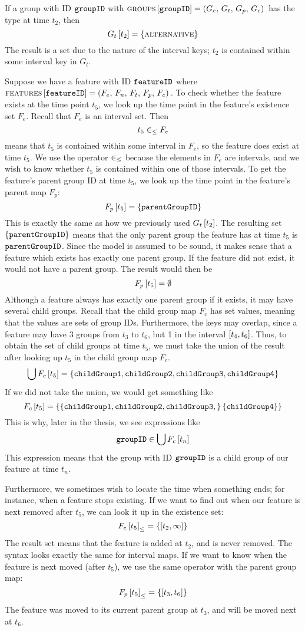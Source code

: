 If a group with ID $\texttt{groupID}$ with $\textsc{groups}{} \left[ \texttt{groupID} \right] = \left(G_e,\, G_t,\, G_p,\, G_c\right){}$ has the type \xortype{} at time $t_2$, then
\[
  G_t \left[ t_2 \right] = \left\{\textsc{alternative}{}\right\}
\]
The result is a set due to the nature of the interval keys; $t_2$ is contained within some interval key in $G_t$. 

Suppose we have a feature with ID $\texttt{featureID}$ where $\textsc{features} \left[ \texttt{featureID} \right] = \left(F_e,\, F_n,\, F_t,\, F_p,\, F_c\right){}$. To check whether the feature exists at the time point $t_5$, we look up the time point in the feature's existence set $F_e$. Recall that $F_e$ is an interval set. Then
\[
  t_5 \in_\leq F_e
\]
means that $t_5$ is contained within some interval in $F_e$, so the feature does exist at time $t_5$. We use the operator $\in_\leq$ because the elements in $F_e$ are intervals, and we wish to know whether $t_5$ is contained within one of those intervals. To get the feature's parent group ID at time $t_5$, we look up the time point in the feature's parent map $F_p$:
\[
  F_p \left[ t_5 \right] = \left\{\texttt{parentGroupID}\right\}
\]
This is exactly the same as how we previously used $G_t \left[ t_2 \right]$. The resulting set $\left\{\texttt{parentGroupID}\right\}$ means that the only parent group the feature has at time $t_5$ is $\texttt{parentGroupID}$. Since the model is assumed to be sound, it makes sense that a feature which exists has exactly one parent group. If the feature did not exist, it would not have a parent group. The result would then be
\[
  F_p \left[ t_5 \right] = \emptyset
\]
Although a feature always has exactly one parent group if it exists, it may have several child groups. Recall that the child group map $F_c$ has set values, meaning that the values are sets of group IDs. Furthermore, the keys may overlap, since a feature may have 3 groups from $t_3$ to $t_6$, but 1 in the interval $\interval{t_4}{t_6}$. Thus, to obtain the set of child groups at time $t_5$, we must take the union of the result after looking up $t_5$ in the child group map $F_c$.
\[
  \bigcup{F_c \left[ t_5 \right]} = \left\{\texttt{childGroup1}, \texttt{childGroup2}, \texttt{childGroup3}, \texttt{childGroup4}\right\}
\]
If we did not take the union, we would get something like
\[
  F_c \left[ t_5 \right] = \left\{\left\{\texttt{childGroup1}, \texttt{childGroup2}, \texttt{childGroup3},\right\} \left\{\texttt{childGroup4}\right\}\right\}
\]
This is why, later in the thesis, we see expressions like
\[
  \texttt{groupID} \in \bigcup{F_c \left[ t_n \right]}
\]
This expression means that the group with ID $\texttt{groupID}$ is a child group of our feature at time $t_n$.

Furthermore, we sometimes wish to locate the time when something ends; for instance, when a feature stops existing. If we want to find out when our feature is next removed after $t_5$, we can look it up in the existence set:
\[
  \containing{F_e}{t_5} = \set{\interval{t_2}{\forever}}
\]
The result set means that the feature is added at $t_2$, and is never removed. The syntax looks exactly the same for interval maps. If we want to know when the feature is next moved (after $t_5$), we use the same operator with the parent group map:
\[
  \containing{F_p}{t_5} = \set{\interval{t_3}{t_6}}
\]
The feature was moved to its current parent group at $t_3$, and will be moved next at $t_6$.

